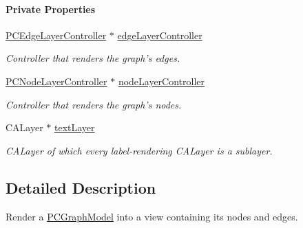 \begin{Indent}\paragraph*{Private Properties}
\begin{DoxyCompactItemize}
\item 
\hypertarget{interface_p_c_graph_view_a3dc66ce30aed4b5373a8f09aa1d4aa55}{
\hyperlink{interface_p_c_edge_layer_controller}{PCEdgeLayerController} $\ast$ \hyperlink{interface_p_c_graph_view_a3dc66ce30aed4b5373a8f09aa1d4aa55}{edgeLayerController}}
\label{interface_p_c_graph_view_a3dc66ce30aed4b5373a8f09aa1d4aa55}

\begin{DoxyCompactList}\small\item\em Controller that renders the graph's edges. \end{DoxyCompactList}\item 
\hypertarget{interface_p_c_graph_view_a338da6d10b34c053975329dca45af12b}{
\hyperlink{interface_p_c_node_layer_controller}{PCNodeLayerController} $\ast$ \hyperlink{interface_p_c_graph_view_a338da6d10b34c053975329dca45af12b}{nodeLayerController}}
\label{interface_p_c_graph_view_a338da6d10b34c053975329dca45af12b}

\begin{DoxyCompactList}\small\item\em Controller that renders the graph's nodes. \end{DoxyCompactList}\item 
\hypertarget{interface_p_c_graph_view_a07060811419422debf57d1ca7333a92e}{
CALayer $\ast$ \hyperlink{interface_p_c_graph_view_a07060811419422debf57d1ca7333a92e}{textLayer}}
\label{interface_p_c_graph_view_a07060811419422debf57d1ca7333a92e}

\begin{DoxyCompactList}\small\item\em CALayer of which every label-\/rendering CALayer is a sublayer. \end{DoxyCompactList}\end{DoxyCompactItemize}
\end{Indent}


\subsection{Detailed Description}
Render a \hyperlink{interface_p_c_graph_model}{PCGraphModel} into a view containing its nodes and edges. 

